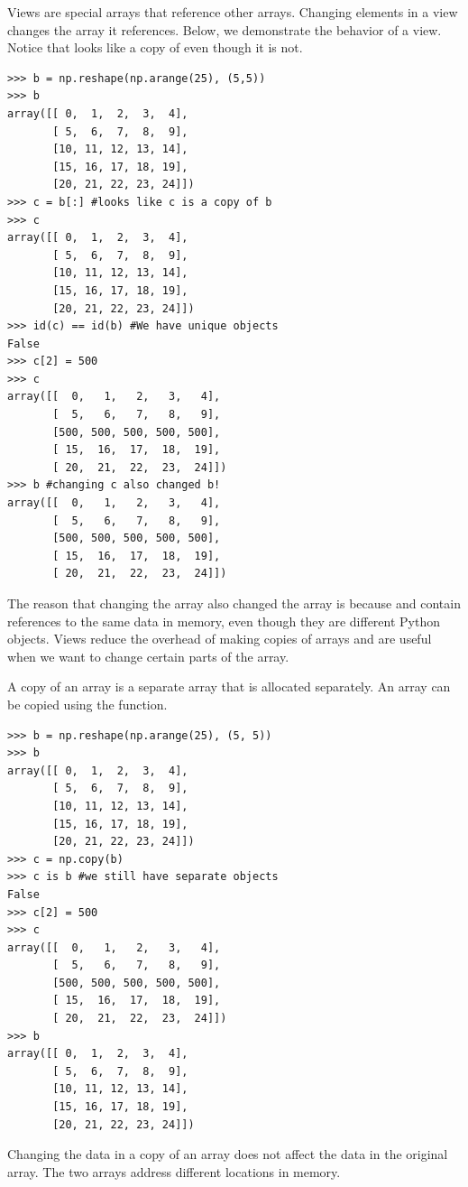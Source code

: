 Views are special arrays that reference other arrays.
Changing elements in a view changes the array it references.
Below, we demonstrate the behavior of a view.
Notice that  looks like a copy of  even though it is not.
\begin{lstlisting}
>>> b = np.reshape(np.arange(25), (5,5))
>>> b
array([[ 0,  1,  2,  3,  4],
       [ 5,  6,  7,  8,  9],
       [10, 11, 12, 13, 14],
       [15, 16, 17, 18, 19],
       [20, 21, 22, 23, 24]])
>>> c = b[:] #looks like c is a copy of b
>>> c
array([[ 0,  1,  2,  3,  4],
       [ 5,  6,  7,  8,  9],
       [10, 11, 12, 13, 14],
       [15, 16, 17, 18, 19],
       [20, 21, 22, 23, 24]])
>>> id(c) == id(b) #We have unique objects
False
>>> c[2] = 500
>>> c
array([[  0,   1,   2,   3,   4],
       [  5,   6,   7,   8,   9],
       [500, 500, 500, 500, 500],
       [ 15,  16,  17,  18,  19],
       [ 20,  21,  22,  23,  24]])
>>> b #changing c also changed b!
array([[  0,   1,   2,   3,   4],
       [  5,   6,   7,   8,   9],
       [500, 500, 500, 500, 500],
       [ 15,  16,  17,  18,  19],
       [ 20,  21,  22,  23,  24]])
\end{lstlisting}
The reason that changing the array  also changed the array  is because  
and  contain references to the same data in memory, even though they are different 
Python objects.
Views reduce the overhead of making copies of arrays and are useful when we want to change 
certain parts of the array.

A copy of an array is a separate array that is allocated separately.
An array can be copied using the  function.
\begin{lstlisting}
>>> b = np.reshape(np.arange(25), (5, 5))
>>> b
array([[ 0,  1,  2,  3,  4],
       [ 5,  6,  7,  8,  9],
       [10, 11, 12, 13, 14],
       [15, 16, 17, 18, 19],
       [20, 21, 22, 23, 24]])
>>> c = np.copy(b)
>>> c is b #we still have separate objects
False
>>> c[2] = 500
>>> c
array([[  0,   1,   2,   3,   4],
       [  5,   6,   7,   8,   9],
       [500, 500, 500, 500, 500],
       [ 15,  16,  17,  18,  19],
       [ 20,  21,  22,  23,  24]])
>>> b
array([[ 0,  1,  2,  3,  4],
       [ 5,  6,  7,  8,  9],
       [10, 11, 12, 13, 14],
       [15, 16, 17, 18, 19],
       [20, 21, 22, 23, 24]])
\end{lstlisting}
Changing the data in a copy of an array does not affect the data in the original array.
The two arrays address different locations in memory.

